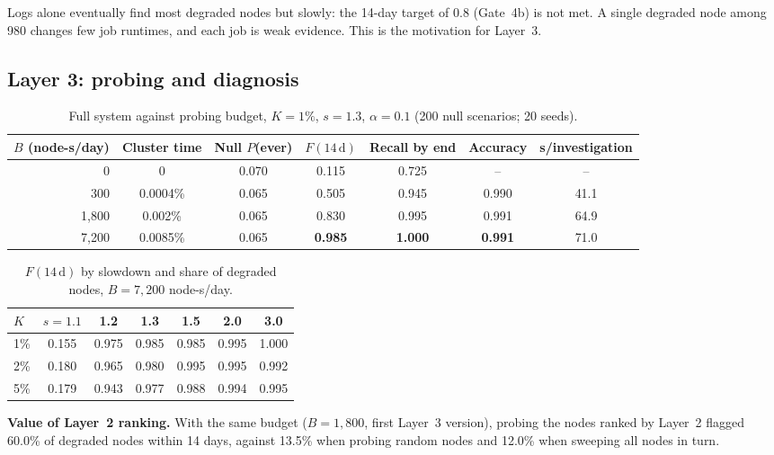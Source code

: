 \documentclass[10pt,a4paper]{article}
\begin{document}
Logs alone eventually find most degraded nodes but slowly: the 14-day target of 0.8 (Gate~4b) is not met. A single degraded node among 980 changes few job runtimes, and each job is weak evidence. This is the motivation for Layer~3.

\subsection{Layer 3: probing and diagnosis}\label{sec:l3res}
\begin{table}[H]
\centering
\caption{Full system against probing budget, $K = 1\%$, $s = 1.3$, $\alpha = 0.1$ (200 null scenarios; 20 seeds).}
\label{tab:l3budget}
\small
\begin{tabular}{@{}rcccccc@{}}
\toprule
$B$ (node-s/day) & Cluster time & Null $P$(ever) & $F(14\,\mathrm{d})$ & Recall by end & Accuracy & s/investigation\\
\midrule
0 & 0 & 0.070 & 0.115 & 0.725 & -- & --\\
300 & 0.0004\% & 0.065 & 0.505 & 0.945 & 0.990 & 41.1\\
1{,}800 & 0.002\% & 0.065 & 0.830 & 0.995 & 0.991 & 64.9\\
7{,}200 & 0.0085\% & 0.065 & \textbf{0.985} & \textbf{1.000} & \textbf{0.991} & 71.0\\
\bottomrule
\end{tabular}
\end{table}

\begin{table}[H]
\centering
\caption{$F(14\,\mathrm{d})$ by slowdown and share of degraded nodes, $B = 7{,}200$ node-s/day.}
\label{tab:l3grid}
\small
\begin{tabular}{@{}lcccccc@{}}
\toprule
$K$ & $s=1.1$ & 1.2 & 1.3 & 1.5 & 2.0 & 3.0\\
\midrule
1\% & 0.155 & 0.975 & 0.985 & 0.985 & 0.995 & 1.000\\
2\% & 0.180 & 0.965 & 0.980 & 0.995 & 0.995 & 0.992\\
5\% & 0.179 & 0.943 & 0.977 & 0.988 & 0.994 & 0.995\\
\bottomrule
\end{tabular}
\end{table}

\textbf{Value of Layer~2 ranking.} With the same budget ($B = 1{,}800$, first Layer~3 version), probing the nodes ranked by Layer~2 flagged 60.0\% of degraded nodes within 14 days, against 13.5\% when probing random nodes and 12.0\% when sweeping all nodes in turn.
\end{document}
